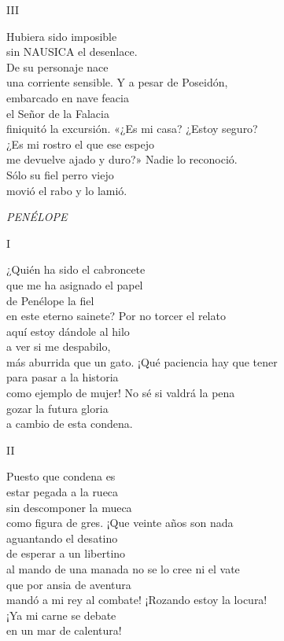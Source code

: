 III

\begin{versocita}
Hubiera sido imposible\\
sin NAUSICA el desenlace.\\
De su personaje nace\\
una corriente sensible.
\stanzabreak
Y a pesar de Poseidón,\\
embarcado en nave feacia\\
el Señor de la Falacia\\
finiquitó la excursión.
\stanzabreak
«¿Es mi casa? ¿Estoy seguro?\\
¿Es mi rostro el que ese espejo\\
me devuelve ajado y duro?»
\stanzabreak
Nadie lo reconoció.\\
Sólo su fiel perro viejo\\
movió el rabo y lo lamió.
\end{versocita}

\emph{PENÉLOPE}

I

\begin{versocita}
¿Quién ha sido el cabroncete\\
que me ha asignado el papel\\
de Penélope la fiel\\
en este eterno sainete?
\stanzabreak
Por no torcer el relato\\
aquí estoy dándole al hilo\\
a ver si me despabilo,\\
más aburrida que un gato.
\stanzabreak
¡Qué paciencia hay que tener\\
para pasar a la historia\\
como ejemplo de mujer!
\stanzabreak
No sé si valdrá la pena\\
gozar la futura gloria\\
a cambio de esta condena.
\end{versocita}

II

\begin{versocita}
Puesto que condena es\\
estar pegada a la rueca\\
sin descomponer la mueca\\
como figura de gres.
\stanzabreak
¡Que veinte años son nada\\
aguantando el desatino\\
de esperar a un libertino\\
al mando de una manada
\stanzabreak
no se lo cree ni el vate\\
que por ansia de aventura\\
mandó a mi rey al combate!
\stanzabreak
¡Rozando estoy la locura!\\
¡Ya mi carne se debate\\
en un mar de calentura!
\end{versocita}

